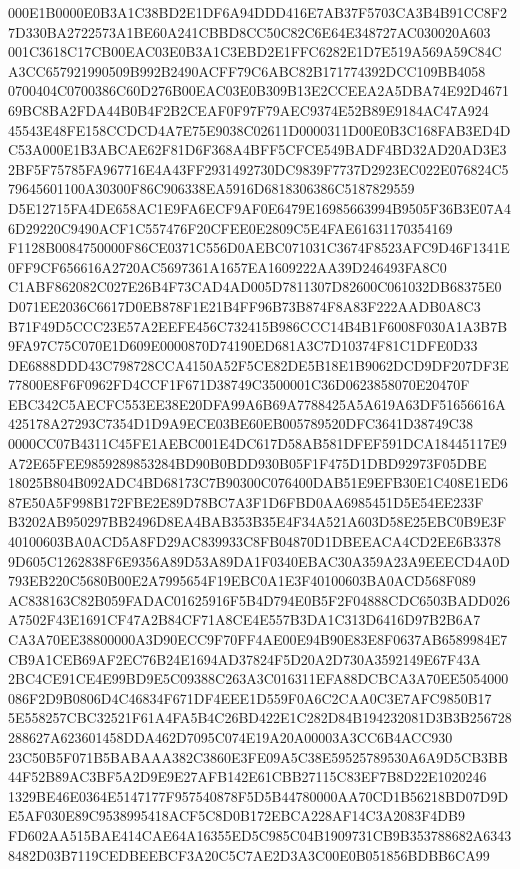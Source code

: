 \documentclass[UTF8,fontset=fandol,zihao=-4,a4paper]{ctexart}
\begin{document}
{{000E1B0000E0B3A1C38BD2E1DF6A94DDD416E7AB37F5703CA3B4B91CC8F27D330BA2722573A1BE60A241CBBD8CC50C82C6E64E348727AC030020A603
001C3618C17CB00EAC03E0B3A1C3EBD2E1FFC6282E1D7E519A569A59C84CA3CC657921990509B992B2490ACFF79C6ABC82B171774392DCC109BB4058
0700404C0700386C60D276B00EAC03E0B309B13E2CCEEA2A5DBA74E92D467169BC8BA2FDA44B0B4F2B2CEAF0F97F79AEC9374E52B89E9184AC47A924
45543E48FE158CCDCD4A7E75E9038C02611D0000311D00E0B3C168FAB3ED4DC53A000E1B3ABCAE62F81D6F368A4BFF5CFCE549BADF4BD32AD20AD3E3
2BF5F75785FA967716E4A43FF2931492730DC9839F7737D2923EC022E076824C579645601100A30300F86C906338EA5916D6818306386C5187829559
D5E12715FA4DE658AC1E9FA6ECF9AF0E6479E16985663994B9505F36B3E07A46D29220C9490ACF1C557476F20CFEE0E2809C5E4FAE61631170354169
F1128B0084750000F86CE0371C556D0AEBC071031C3674F8523AFC9D46F1341E0FF9CF656616A2720AC5697361A1657EA1609222AA39D246493FA8C0
C1ABF862082C027E26B4F73CAD4AD005D7811307D82600C061032DB68375E0D071EE2036C6617D0EB878F1E21B4FF96B73B874F8A83F222AADB0A8C3
B71F49D5CCC23E57A2EEFE456C732415B986CCC14B4B1F6008F030A1A3B7B9FA97C75C070E1D609E0000870D74190ED681A3C7D10374F81C1DFE0D33
DE6888DDD43C798728CCA4150A52F5CE82DE5B18E1B9062DCD9DF207DF3E77800E8F6F0962FD4CCF1F671D38749C3500001C36D0623858070E20470F
EBC342C5AECFC553EE38E20DFA99A6B69A7788425A5A619A63DF51656616A425178A27293C7354D1D9A9ECE03BE60EB005789520DFC3641D38749C38
0000CC07B4311C45FE1AEBC001E4DC617D58AB581DFEF591DCA18445117E9A72E65FEE9859289853284BD90B0BDD930B05F1F475D1DBD92973F05DBE
18025B804B092ADC4BD68173C7B90300C076400DAB51E9EFB30E1C408E1ED687E50A5F998B172FBE2E89D78BC7A3F1D6FBD0AA6985451D5E54EE233F
B3202AB950297BB2496D8EA4BAB353B35E4F34A521A603D58E25EBC0B9E3F40100603BA0ACD5A8FD29AC839933C8FB04870D1DBEEACA4CD2EE6B3378
9D605C1262838F6E9356A89D53A89DA1F0340EBAC30A359A23A9EEECD4A0D793EB220C5680B00E2A7995654F19EBC0A1E3F40100603BA0ACD568F089
AC838163C82B059FADAC01625916F5B4D794E0B5F2F04888CDC6503BADD026A7502F43E1691CF47A2B84CF71A8CE4E557B3DA1C313D6416D97B2B6A7
CA3A70EE38800000A3D90ECC9F70FF4AE00E94B90E83E8F0637AB6589984E7CB9A1CEB69AF2EC76B24E1694AD37824F5D20A2D730A3592149E67F43A
2BC4CE91CE4E99BD9E5C09388C263A3C016311EFA88DCBCA3A70EE5054000086F2D9B0806D4C46834F671DF4EEE1D559F0A6C2CAA0C3E7AFC9850B17
5E558257CBC32521F61A4FA5B4C26BD422E1C282D84B194232081D3B3B256728288627A623601458DDA462D7095C074E19A20A00003A3CC6B4ACC930
23C50B5F071B5BABAAA382C3860E3FE09A5C38E59525789530A6A9D5CB3BB44F52B89AC3BF5A2D9E9E27AFB142E61CBB27115C83EF7B8D22E1020246
1329BE46E0364E5147177F957540878F5D5B44780000AA70CD1B56218BD07D9DE5AF030E89C9538995418ACF5C8D0B172EBCA228AF14C3A2083F4DB9
FD602AA515BAE414CAE64A16355ED5C985C04B1909731CB9B353788682A63438482D03B7119CEDBEEBCF3A20C5C7AE2D3A3C00E0B051856BDBB6CA99
}}
\end{document}
